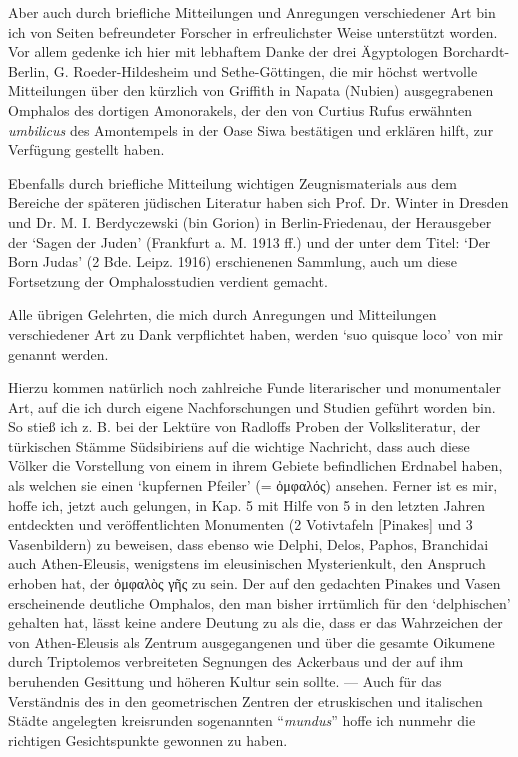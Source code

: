 \documentclass[a4paper, 11pt, oneside]{article}
\begin{document}
Aber auch durch briefliche Mitteilungen und Anregungen verschiedener Art bin ich von Seiten befreundeter Forscher in erfreulichster Weise unterstützt worden. Vor allem gedenke ich hier mit lebhaftem Danke der drei Ägyptologen Borchardt-Berlin, G. Roeder-Hildesheim und Sethe-Göttingen, die mir höchst wertvolle Mitteilungen über den kürzlich von Griffith in Napata (Nubien) ausgegrabenen Omphalos des dortigen Amonorakels, der den von Curtius Rufus erwähnten \emph{umbilicus} des Amontempels in der Oase Siwa bestätigen und erklären hilft, zur Verfügung gestellt haben.

Ebenfalls durch briefliche Mitteilung wichtigen Zeugnismaterials aus dem Bereiche der späteren jüdischen Literatur haben sich Prof. Dr. Winter in Dresden und Dr. M. I. Berdyczewski (bin Gorion) in Berlin-Friedenau, der Herausgeber der `Sagen der Juden' (Frankfurt a. M. 1913 ff.) und der unter dem Titel: `Der Born Judas' (2 Bde. Leipz. 1916) erschienenen Sammlung, auch um diese Fortsetzung der Omphalosstudien verdient gemacht.

Alle übrigen Gelehrten, die mich durch Anregungen und Mitteilungen verschiedener Art zu Dank verpflichtet haben, werden `suo quisque loco' von mir genannt werden.

Hierzu kommen natürlich noch zahlreiche Funde literarischer und monumentaler Art, auf die ich durch eigene Nachforschungen und Studien geführt worden bin. So stieß ich z. B. bei der Lektüre von Radloffs Proben der Volksliteratur, der türkischen Stämme Südsibiriens auf die wichtige Nachricht, dass auch diese Völker die Vorstellung von einem in ihrem Gebiete befindlichen Erdnabel haben, als welchen sie einen `kupfernen Pfeiler' (= ὀμφαλός) ansehen. Ferner ist es mir, hoffe ich, jetzt auch gelungen, in Kap. 5 mit Hilfe von 5 in den letzten Jahren entdeckten und veröffentlichten Monumenten (2 Votivtafeln [Pinakes] und 3 Vasenbildern) zu beweisen, dass ebenso wie Delphi, Delos, Paphos, Branchidai auch Athen-Eleusis, wenigstens im eleusinischen Mysterienkult, den Anspruch erhoben hat, der ὀμφαλὸς γῆς zu sein. Der auf den gedachten Pinakes und Vasen erscheinende deutliche Omphalos, den man bisher irrtümlich für den `delphischen' gehalten hat, lässt keine andere Deutung zu als die, dass er das Wahrzeichen der von Athen-Eleusis als Zentrum ausgegangenen und über die gesamte Oikumene durch Triptolemos verbreiteten Segnungen des Ackerbaus und der auf ihm beruhenden Gesittung und höheren Kultur sein sollte. --- Auch für das Verständnis des in den geometrischen Zentren der etruskischen und italischen Städte angelegten kreisrunden sogenannten "`\emph{mundus}"' hoffe ich nunmehr die richtigen Gesichtspunkte gewonnen zu haben.
\end{document}
